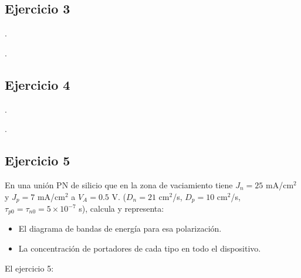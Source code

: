 
\begin{Enunciado}
	\subsection*{Ejercicio 3}
    
	\lipsum[1].
\end{Enunciado}

\vspace*{1em}

\lipsum[1].


\begin{Enunciado}
	\subsection*{Ejercicio 4}
    
	\lipsum[1].
\end{Enunciado}

\vspace*{1em}

\lipsum[1].

\vspace*{2em}



\subsection*{Ejercicio 5} 

\begin{Enunciado}
    
En una unión PN de silicio que en la zona de vaciamiento tiene $J_n = 25$ mA/cm$^2$ y 
$J_p = 7$ mA/cm$^2$ a $V_A = 0.5$ V. ($D_n = 21$ cm$^2$/s, $D_p = 10$ cm$^2$/s, 
$\tau_{p0} = \tau_{n0} = 5 \times 10^{-7}$ s), calcula y representa:

\begin{itemize}
    \item El diagrama de bandas de energía para esa polarización.
    \item La concentración de portadores de cada tipo en todo el dispositivo.
\end{itemize}


\end{Enunciado}
El ejercicio 5:

